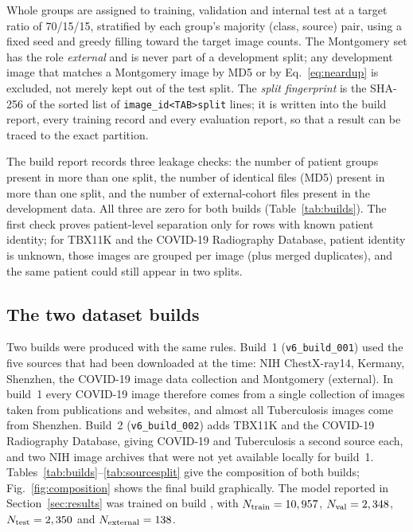 Whole groups are assigned to training, validation and internal test at a target ratio of 70/15/15, stratified by each group's majority (class, source) pair, using a fixed seed and greedy filling toward the target image counts. The Montgomery set has the role \emph{external} and is never part of a development split; any development image that matches a Montgomery image by MD5 or by Eq.~\eqref{eq:neardup} is excluded, not merely kept out of the test split. The \emph{split fingerprint} is the SHA-256 of the sorted list of \texttt{image\_id<TAB>split} lines; it is written into the build report, every training record and every evaluation report, so that a result can be traced to the exact partition.

The build report records three leakage checks: the number of patient groups present in more than one split, the number of identical files (MD5) present in more than one split, and the number of external-cohort files present in the development data. All three are zero for both builds (Table~\ref{tab:builds}). The first check proves patient-level separation only for rows with known patient identity; for TBX11K and the COVID-19 Radiography Database, patient identity is unknown, those images are grouped per image (plus merged duplicates), and the same patient could still appear in two splits.

\subsection{The two dataset builds}
\label{sec:builds}
Two builds were produced with the same rules. Build~1 (\texttt{v6\_build\_001}) used the five sources that had been downloaded at the time: NIH ChestX-ray14, Kermany, Shenzhen, the COVID-19 image data collection and Montgomery (external). In build~1 every COVID-19 image therefore comes from a single collection of images taken from publications and websites, and almost all Tuberculosis images come from Shenzhen. Build~2 (\texttt{v6\_build\_002}) adds TBX11K and the COVID-19 Radiography Database, giving COVID-19 and Tuberculosis a second source each, and two NIH image archives that were not yet available locally for build~1. Tables~\ref{tab:builds}--\ref{tab:sourcesplit} give the composition of both builds; Fig.~\ref{fig:composition} shows the final build graphically. The model reported in Section~\ref{sec:results} was trained on build \RDatasetBuild, with $N_{\text{train}}=10,957$, $N_{\text{val}}=2,348$, $N_{\text{test}}=2,350$ and $N_{\text{external}}=138$.

